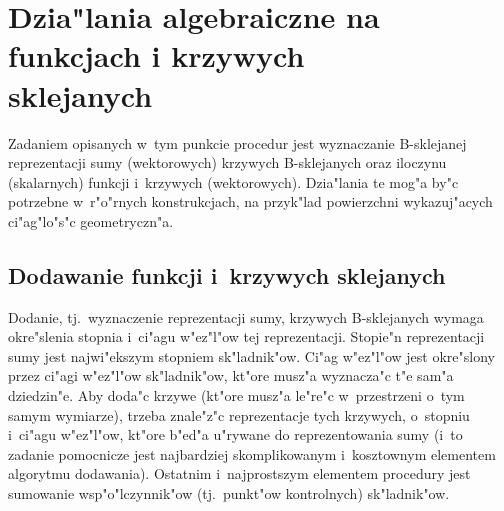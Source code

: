 

\newpage
\section[Dzia"lania algebraiczne na funkcjach i krzywych sklejanych]%
{Dzia"lania algebraiczne na funkcjach i krzywych \\ sklejanych}

\begin{sloppypar}
Zadaniem opisanych w~tym punkcie procedur jest wyznaczanie
B-sklejanej reprezentacji sumy (wektorowych) krzywych B-sklejanych oraz
iloczynu (skalarnych) funkcji i~krzywych (wektorowych). Dzia"lania te mog"a
by"c potrzebne w~r"o"rnych konstrukcjach, na przyk"lad powierzchni
wykazuj"acych ci"ag"lo"s"c geometryczn"a.
\end{sloppypar}


\subsection{Dodawanie funkcji i~krzywych sklejanych}

Dodanie, tj.\ wyznaczenie reprezentacji sumy, krzywych B-sklejanych wymaga
okre"s\-le\-nia stopnia i~ci"agu w"ez"l"ow tej reprezentacji. Stopie"n
reprezentacji sumy jest najwi"ekszym stopniem sk"ladnik"ow. Ci"ag w"ez"l"ow
jest okre"slony przez ci"agi w"ez\-"l"ow sk"ladnik"ow, kt"ore musz"a
wyznacza"c t"e sam"a dziedzin"e.
Aby doda"c krzywe (kt"ore musz"a le"re"c w~przestrzeni o~tym samym
wymiarze), trzeba znale"z"c reprezentacje tych krzywych, o~stopniu i~ci"agu
w"ez"l"ow, kt"ore b"ed"a u"rywane do reprezentowania sumy (i~to zadanie
pomocnicze jest najbardziej skomplikowanym i~kosztownym elementem algorytmu
dodawania). Ostatnim i~najprostszym elementem procedury jest sumowanie
wsp"o"lczynnik"ow (tj.\ punkt"ow kontrolnych) sk"ladnik"ow.

